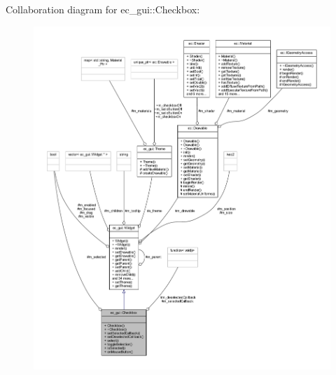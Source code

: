 Collaboration diagram for ec\+\_\+gui\+:\+:Checkbox\+:\nopagebreak
\begin{figure}[H]
\begin{center}
\leavevmode
\includegraphics[width=350pt]{classec__gui_1_1_checkbox__coll__graph}
\end{center}
\end{figure}
